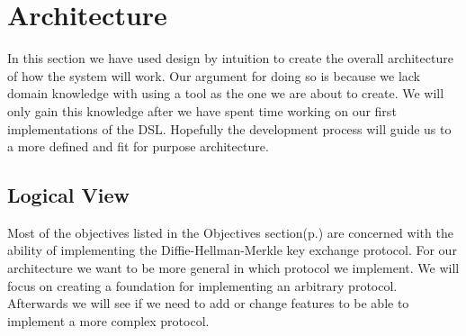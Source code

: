 \section{Architecture}
In this section we have used design by intuition to create the overall architecture of how the system will work. Our argument for doing so is because we lack domain knowledge with using a tool as the one we are about to create. We will only gain this knowledge after we have spent time working on our first implementations of the DSL. Hopefully the development process will guide us to a more defined and fit for purpose architecture.

\subsection{Logical View}
Most of the objectives listed in the Objectives section(p.\pageref{sec:objectives}) are concerned with the ability of implementing the Diffie-Hellman-Merkle key exchange protocol. For our architecture we want to be more general in which protocol we implement. We will focus on creating a foundation for implementing an arbitrary protocol. Afterwards we will see if we need to add or change features to be able to implement a more complex protocol.

